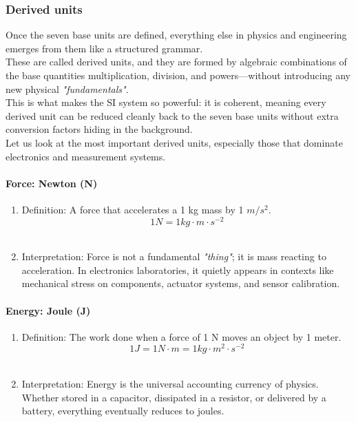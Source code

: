 \documentclass[../main.tex]{subfiles}
\begin{document}
\subsubsection{Derived units}

Once the seven base units are defined, everything else in physics and engineering emerges from them like a structured grammar.\\

These are called derived units, and they are formed by algebraic combinations of the base quantities multiplication, division, and powers—without introducing any new physical \textit{"fundamentals"}.\\

This is what makes the SI system so powerful: it is coherent, meaning every derived unit can be reduced cleanly back to the seven base units without extra conversion factors hiding in the background.\\

Let us look at the most important derived units, especially those that dominate electronics and measurement systems.\\

\paragraph{Force: Newton (N)}

\begin{enumerate}[label=\textbf{-}]
	\item Definition: A force that accelerates a 1 kg mass by 1 $m/s^2$.
			\[ 1\unit{N} = 1 \unit{kg} \cdot \unit{m} \cdot \unit{s}^{-2} \]\	
	\item Interpretation: Force is not a fundamental \textit{"thing"}; it is mass reacting to acceleration. In electronics laboratories, it quietly appears in contexts like mechanical stress on components, actuator systems, and sensor calibration.\\
\end{enumerate}

\paragraph{Energy: Joule (J)}

\begin{enumerate}[label=\textbf{-}]
	\item Definition: The work done when a force of 1 N moves an object by 1 meter.
		\[ 1\unit{J} = 1 \unit{N} \cdot \unit{m} =  1 \unit{kg} \cdot \unit{m}^2 \cdot \unit{s}^{-2}\]\
	\item Interpretation: Energy is the universal accounting currency of physics. Whether stored in a capacitor, dissipated in a resistor, or delivered by a battery, everything eventually reduces to joules.\\
\end{enumerate}
\end{document}
